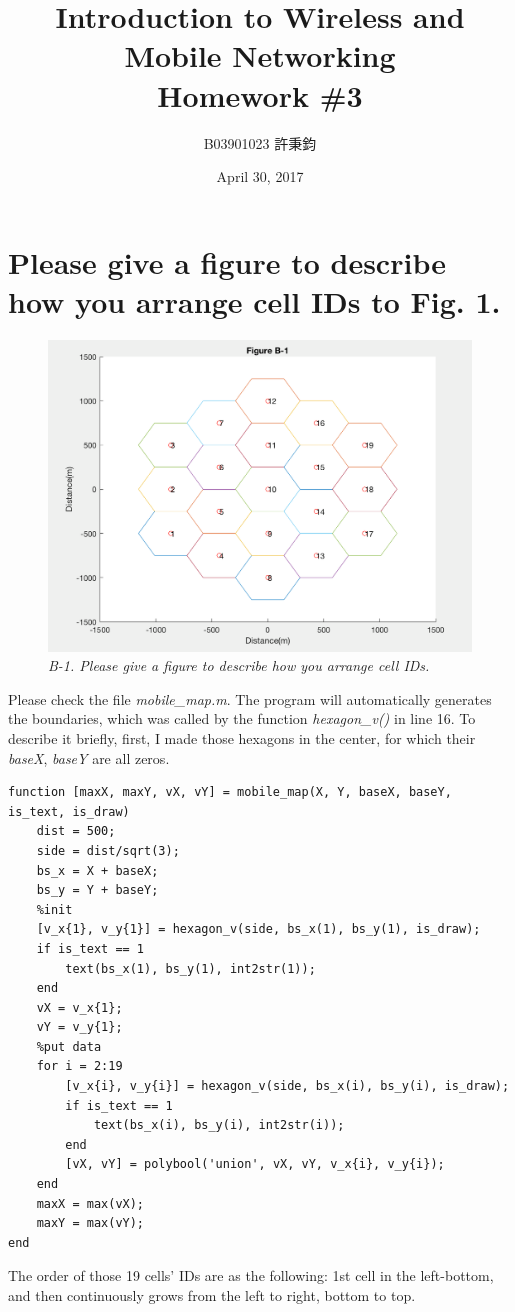 \documentclass{article}
\title{Introduction to Wireless and Mobile Networking\\ Homework \#3}
\author{B03901023 許秉鈞}
\date{April 30, 2017} %
\begin{document}
\maketitle

\section{Please give a figure to describe how you arrange cell IDs to Fig. 1.}
\begin{figure}[h]
    \centering
    \includegraphics[width=1\textwidth]{fig1}
    \caption{\emph{B-1. Please give a figure to describe how you arrange cell IDs.}}
    \label{fig:mesh1}
\end{figure}



Please check the file \emph{mobile\_map.m}. The program will automatically generates the boundaries, which was called by the function \emph{hexagon\_v()} in line 16. To describe it briefly, first, I made those hexagons in the center, for which their \emph{baseX}, \emph{baseY} are all zeros.

\pagebreak

\begin{lstlisting}[caption = {mobile\_map.m}]
function [maxX, maxY, vX, vY] = mobile_map(X, Y, baseX, baseY, is_text, is_draw)
    dist = 500;
    side = dist/sqrt(3);
    bs_x = X + baseX;
    bs_y = Y + baseY;
    %init
    [v_x{1}, v_y{1}] = hexagon_v(side, bs_x(1), bs_y(1), is_draw);
    if is_text == 1
        text(bs_x(1), bs_y(1), int2str(1));
    end
    vX = v_x{1};
    vY = v_y{1};
    %put data
    for i = 2:19
        [v_x{i}, v_y{i}] = hexagon_v(side, bs_x(i), bs_y(i), is_draw);
        if is_text == 1
            text(bs_x(i), bs_y(i), int2str(i));
        end
        [vX, vY] = polybool('union', vX, vY, v_x{i}, v_y{i});
    end
    maxX = max(vX);
    maxY = max(vY);
end
\end{lstlisting}
The order of those 19 cells' IDs are as the following: 1st cell in the left-bottom, and then continuously grows from the left to right, bottom to top.
\pagebreak
\end{document}
